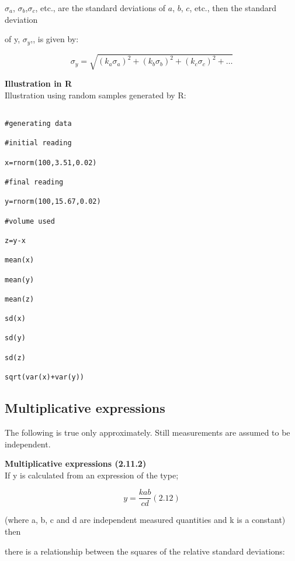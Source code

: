 $\sigma_a$, $\sigma_b$,$\sigma_c$, etc., are the standard deviations of $a$, $b$, $c$, etc., then the standard deviation

of y, $\sigma_y$,, is given by:

\[ \sigma_y = \sqrt{(k_a\sigma_a)^2 + (k_b\sigma_b)^2 + (k_c\sigma_c)^2 + \ldots}\]

 

\textbf{Illustration in R}\\

Illustration using random samples generated by R:

\begin{verbatim}

#generating data

#initial reading

x=rnorm(100,3.51,0.02)

#final reading

y=rnorm(100,15.67,0.02)

#volume used

z=y-x

mean(x)

mean(y)

mean(z)

sd(x)

sd(y)

sd(z)

sqrt(var(x)+var(y))

\end{verbatim}

 

\subsection{Multiplicative expressions}

The following is true only approximately. Still measurements are assumed to be independent.

 

\noindent \textbf{Multiplicative expressions (2.11.2)}\\

If y is calculated from an expression of the type;

\[ y = \frac{kab}{cd} (2.12)\]

 

(where a, b, c and d are independent measured quantities and k is a constant) then

there is a relationship between the squares of the relative standard deviations:


